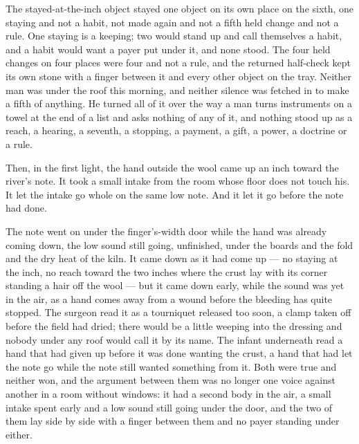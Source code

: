 The stayed-at-the-inch object stayed one object on its own place on the sixth, one staying and not a habit, not made again and not a fifth held change and not a rule. One staying is a keeping; two would stand up and call themselves a habit, and a habit would want a payer put under it, and none stood. The four held changes on four places were four and not a rule, and the returned half-check kept its own stone with a finger between it and every other object on the tray. Neither man was under the roof this morning, and neither silence was fetched in to make a fifth of anything. He turned all of it over the way a man turns instruments on a towel at the end of a list and asks nothing of any of it, and nothing stood up as a reach, a hearing, a seventh, a stopping, a payment, a gift, a power, a doctrine or a rule.

Then, in the first light, the hand outside the wool came up an inch toward the river's note. It took a small intake from the room whose floor does not touch his. It let the intake go whole on the same low note. And it let it go before the note had done.

The note went on under the finger's-width door while the hand was already coming down, the low sound still going, unfinished, under the boards and the fold and the dry heat of the kiln. It came down as it had come up --- no staying at the inch, no reach toward the two inches where the crust lay with its corner standing a hair off the wool --- but it came down early, while the sound was yet in the air, as a hand comes away from a wound before the bleeding has quite stopped. The surgeon read it as a tourniquet released too soon, a clamp taken off before the field had dried; there would be a little weeping into the dressing and nobody under any roof would call it by its name. The infant underneath read a hand that had given up before it was done wanting the crust, a hand that had let the note go while the note still wanted something from it. Both were true and neither won, and the argument between them was no longer one voice against another in a room without windows: it had a second body in the air, a small intake spent early and a low sound still going under the door, and the two of them lay side by side with a finger between them and no payer standing under either.

